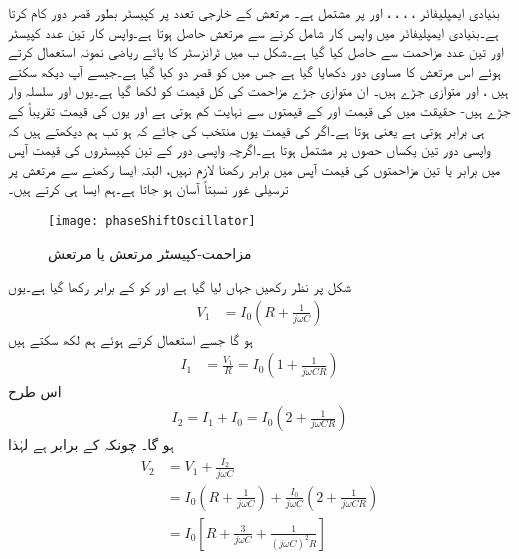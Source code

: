 بنیادی ایمپلیفائر ، ، ، ،  اور  پر مشتمل ہے۔ مرتعش کے خارجی تعدد پر کپیسٹر  بطور قصر دور کام کرتا ہے۔بنیادی ایمپلیفائر میں واپس کار شامل کرنے سے مرتعش حاصل ہوتا ہے۔واپس کار تین عدد کپیسٹر اور تین عدد مزاحمت سے حاصل کیا گیا ہے۔شکل  ب میں ٹرانزسٹر کا پائے  ریاضی نمونہ استعمال کرتے ہوئے اس مرتعش کا مساوی دور دکھایا گیا ہے جس میں  کو قصر دو کیا گیا ہے۔جیسے آپ دیکھ سکتے ہیں ،  اور  متوازی جڑے ہیں۔ ان متوازی جڑے مزاحمت کی کل قیمت کو  لکھا گیا ہے۔یوں  اور  سلسلہ وار جڑے ہیں- حقیقت میں  کی قیمت  اور  کے قیمتوں سے نہایت کم ہوتی ہے اور یوں  کی قیمت تقریباً  کے ہی برابر ہوتی ہے یعنی  ہوتا ہے۔اگر  کی قیمت یوں منتخب کی جائے کہ  ہو تب ہم دیکھتے ہیں کہ واپسی دور تین یکساں   حصوں پر مشتمل ہوتا ہے۔اگرچہ واپسی دور کے تین کپیسٹروں کی قیمت آپس میں برابر یا تین مزاحمتوں کی قیمت آپس میں برابر رکھنا لازم نہیں، البتہ ایسا رکھنے سے مرتعش پر ترسیلی غور نسبتاً آسان ہو جاتا ہے۔ہم ایسا ہی کرتے ہیں۔
\begin{figure}
\centering
\texttt{[image: phaseShiftOscillator]}
\caption{مزاحمت-کپیسٹر مرتعش یا  مرتعش}
\label{شکل_مزاحمت_کپیسٹر_مرتعش}
\end{figure}
شکل  پر نظر رکھیں جہاں  لیا گیا ہے اور  کو  کے برابر رکھا گیا ہے۔یوں
\begin{align*}
V_1 &=I_0 \left(R+\frac{1}{j \omega C} \right)
\end{align*}
ہو گا جسے استعمال کرتے ہوئے ہم لکھ سکتے ہیں
\begin{align*}
I_1 &=\frac{V_1}{R}=I_0 \left (1+\frac{1}{j \omega C R} \right)
\end{align*}
اس طرح
\begin{align*}
I_2 =I_1+I_0=I_0 \left (2+\frac{1}{j \omega C R} \right)
\end{align*}
ہو گا۔ چونکہ  کے برابر ہے لہٰذا
\begin{align*}
V_2 &=V_1+\frac{I_2}{j \omega C} \\
&=I_0 \left (R+\frac{1}{j \omega C} \right )+\frac{I_0}{j \omega C} \left (2+\frac{1}{j \omega C R} \right )\\
&=I_0 \left [R+\frac{3}{j \omega C} +\frac{1}{\left(j \omega C \right )^2 R}\right ]
\end{align*}

